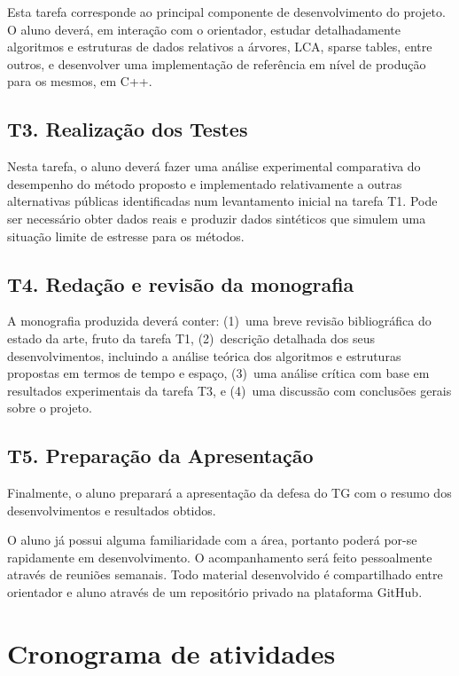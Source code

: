 \documentclass[12pt, a4paper, oneside]{article}
\begin{document}
Esta tarefa corresponde ao principal componente de desenvolvimento do projeto. O aluno deverá, em interação com o orientador, estudar detalhadamente algoritmos e estruturas de dados relativos a árvores, LCA, sparse tables, entre outros, e desenvolver uma implementação de referência em nível de produção para os mesmos, em C++.


\subsection{T3. Realização dos Testes}

Nesta tarefa, o aluno deverá fazer uma análise experimental comparativa do desempenho do método proposto e implementado relativamente a outras alternativas públicas identificadas num levantamento inicial na tarefa T1. Pode ser necessário obter dados reais e produzir dados sintéticos que simulem uma situação limite de estresse para os métodos.


\subsection{T4. Redação e revisão da monografia}

A monografia produzida deverá conter:
(1)~uma breve revisão bibliográfica do estado da arte, fruto da tarefa T1, (2)~descrição detalhada dos seus desenvolvimentos, incluindo a análise teórica dos algoritmos e estruturas propostas em termos de tempo e espaço, (3)~uma análise crítica com base em resultados experimentais da tarefa T3, e (4)~uma discussão com conclusões gerais sobre o projeto.


\subsection{T5. Preparação da Apresentação}

Finalmente, o aluno preparará a apresentação da defesa do TG com o resumo dos desenvolvimentos e resultados obtidos.

\medskip

O aluno já possui alguma familiaridade com a área, portanto poderá por-se rapidamente em desenvolvimento. O acompanhamento será feito pessoalmente através de reuniões semanais. Todo material desenvolvido é compartilhado entre orientador e aluno através de um repositório privado na plataforma GitHub. 


\clearpage
\section{Cronograma de atividades}
\end{document}
